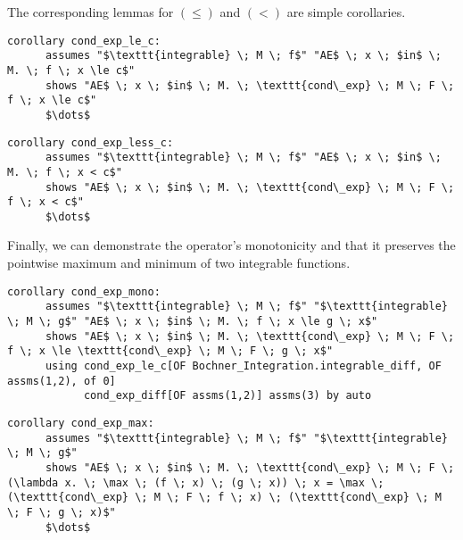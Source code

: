 The corresponding lemmas for $(\le)$ and $(<)$ are simple corollaries.

\begin{isacorollary}
{\small
	\begin{lstlisting}[style=isabelle]
	corollary cond_exp_le_c:
	  assumes "$\texttt{integrable} \; M \; f$" "AE$ \; x \; $in$ \; M. \; f \; x \le c$"
	  shows "AE$ \; x \; $in$ \; M. \; \texttt{cond\_exp} \; M \; F \; f \; x \le c$"
	  $\dots$
	\end{lstlisting}
}
\end{isacorollary}

\begin{isacorollary}
{\small
	\begin{lstlisting}[style=isabelle]
	corollary cond_exp_less_c:
	  assumes "$\texttt{integrable} \; M \; f$" "AE$ \; x \; $in$ \; M. \; f \; x < c$"
	  shows "AE$ \; x \; $in$ \; M. \; \texttt{cond\_exp} \; M \; F \; f \; x < c$"
	  $\dots$
	\end{lstlisting}
}
\end{isacorollary}

Finally, we can demonstrate the operator's monotonicity and that it preserves the pointwise maximum and minimum of two integrable functions.

\begin{isacorollary}
{\small
	\begin{lstlisting}[style=isabelle]
	corollary cond_exp_mono:
	  assumes "$\texttt{integrable} \; M \; f$" "$\texttt{integrable} \; M \; g$" "AE$ \; x \; $in$ \; M. \; f \; x \le g \; x$"
	  shows "AE$ \; x \; $in$ \; M. \; \texttt{cond\_exp} \; M \; F \; f \; x \le \texttt{cond\_exp} \; M \; F \; g \; x$"
	  using cond_exp_le_c[OF Bochner_Integration.integrable_diff, OF assms(1,2), of 0] 
			cond_exp_diff[OF assms(1,2)] assms(3) by auto
	\end{lstlisting}
}
\end{isacorollary}

\begin{isacorollary}
{\small
	\begin{lstlisting}[style=isabelle]
	corollary cond_exp_max:
	  assumes "$\texttt{integrable} \; M \; f$" "$\texttt{integrable} \; M \; g$"
	  shows "AE$ \; x \; $in$ \; M. \; \texttt{cond\_exp} \; M \; F \; (\lambda x. \; \max \; (f \; x) \; (g \; x)) \; x = \max \; (\texttt{cond\_exp} \; M \; F \; f \; x) \; (\texttt{cond\_exp} \; M \; F \; g \; x)$"
	  $\dots$
	\end{lstlisting}
}
\end{isacorollary}

